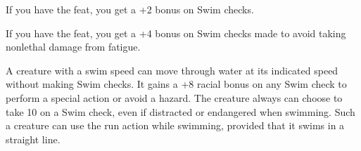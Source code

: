 If you have the  feat, you get a +2 bonus on Swim checks.

If you have the  feat, you get a +4 bonus on Swim checks made to avoid 
taking nonlethal damage from fatigue.

A creature with a swim speed can move through water at its indicated speed without 
making Swim checks. It gains a +8 racial bonus on any Swim check to perform a special 
action or avoid a hazard. The creature always can choose to take 10 on a Swim check, 
even if distracted or endangered when swimming. Such a creature can use the run 
action while swimming, provided that it swims in a straight line.
